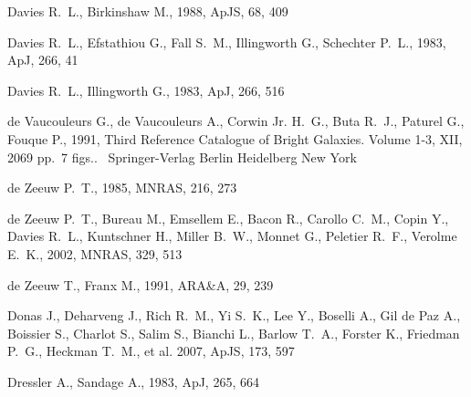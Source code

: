 \documentclass[usenatbib,usegraphicx]{mn2e}
\def\araa{ARA\&A}       %
\def\apj{ApJ}           %
\def\apjs{ApJS}         %
\def\mnras{MNRAS}       %
\begin{document}
\begin{thebibliography}{}
{Davies} R.~L.,  {Birkinshaw} M.,  1988, \apjs, 68, 409

{Davies} R.~L.,  {Efstathiou} G.,  {Fall} S.~M.,  {Illingworth} G.,
  {Schechter} P.~L.,  1983, \apj, 266, 41

{Davies} R.~L.,  {Illingworth} G.,  1983, \apj, 266, 516

{de Vaucouleurs} G.,  {de Vaucouleurs} A.,  {Corwin} Jr. H.~G.,  {Buta} R.~J.,
  {Paturel} G.,    {Fouque} P.,  1991, {Third Reference Catalogue of Bright
  Galaxies}.
Volume 1-3, XII, 2069 pp.~7 figs..~ Springer-Verlag Berlin Heidelberg New York

{de Zeeuw} P.~T.,  1985, \mnras, 216, 273

{de Zeeuw} P.~T.,  {Bureau} M.,  {Emsellem} E.,  {Bacon} R.,  {Carollo} C.~M.,
  {Copin} Y.,  {Davies} R.~L.,  {Kuntschner} H.,  {Miller} B.~W.,  {Monnet} G.,
   {Peletier} R.~F.,    {Verolme} E.~K.,  2002, \mnras, 329, 513

{de Zeeuw} T.,  {Franx} M.,  1991, \araa, 29, 239

{Donas} J.,  {Deharveng} J.,  {Rich} R.~M.,  {Yi} S.~K.,  {Lee} Y.,  {Boselli}
  A.,  {Gil de Paz} A.,  {Boissier} S.,  {Charlot} S.,  {Salim} S.,  {Bianchi}
  L.,  {Barlow} T.~A.,  {Forster} K.,  {Friedman} P.~G.,  {Heckman} T.~M.,
  {et al.} 2007, \apjs, 173, 597

{Dressler} A.,  {Sandage} A.,  1983, \apj, 265, 664


\end{thebibliography}
\end{document}
